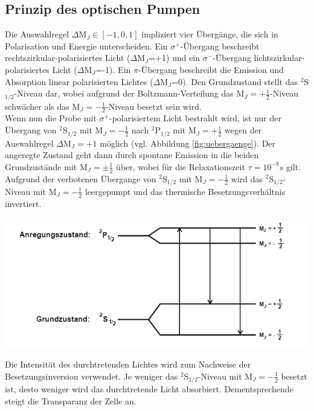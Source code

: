 \documentclass[]{scrartcl}
\begin{document}
\subsection{Prinzip des optischen Pumpen}
Die Auswahlregel $\Delta$M$_J\in[-1,0,1]$ impliziert vier Übergänge, die sich in Polarisation und Energie unterscheiden. Ein $\sigma^+$-Übergang beschreibt rechtszirkular-polarisiertes Licht ($\Delta$M$_J$=+1) und ein $\sigma^-$-Übergang lichtszirkular-polarisiertes Licht ($\Delta$M$_J$=-1). Ein $\pi$-Übergang beschreibt die Emission und Absorption linear polarisierten Lichtes ($\Delta$M$_J$=0). Den Grundzustand stellt das $^2$S$_{1/2}$-Niveau dar, wobei aufgrund der Boltzmann-Verteilung das M$_J=+\frac{1}{2}$-Niveau schwächer als das M$_J=-\frac{1}{2}$-Niveau besetzt sein wird. \\
Wenn nun die Probe mit $\sigma^+$-polarisiertem Licht bestrahlt wird, ist nur der Übergang von $^2$S$_{1/2}$ mit M$_J=-\frac{1}{2}$ nach  $^2$P$_{1/2}$ mit M$_J=+\frac{1}{2}$ wegen der Auswahlregel $\Delta$M$_J=+1$ möglich (vgl. Abbildung \ref{fig:uebergaenge}). Der angeregte Zustand geht dann durch spontane Emission in die beiden Grundzustände mit M$_J=\pm\frac{1}{2}$ über, wobei für die Relaxationszeit $\tau=10^{-8}\si{s}$ gilt. \\
Aufgrund der verbotenen Übergange von $^2$S$_{1/2}$ mit M$_J=-\frac{1}{2}$ wird das $^2$S$_{1/2}$-Niveau mit M$_J=-\frac{1}{2}$ leergepumpt und das thermische Besetzungsverhältnis invertiert.
\begin{center}
	\includegraphics[width=\textwidth]{images/uebergaenge.png}
	\label{fig:uebergaenge}
\end{center}
Die Intensität des durchtretenden Lichtes wird zum Nachweise der Besetzungsinversion verwendet. Je weniger das $^2$S$_{1/2}$-Niveau mit M$_J=-\frac{1}{2}$ besetzt ist, desto weniger wird das durchtretende Licht absorbiert. Dementsprechende steigt die Transparanz der Zelle an.
\end{document}
